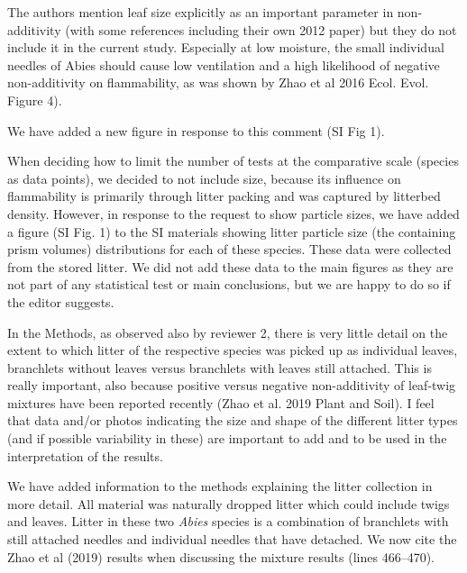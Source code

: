 \documentclass[letterpaper, 12pt]{letter}
\begin{document}
\begin{letter}{}
\begin{quoting}
  The authors mention leaf size explicitly as an important parameter in
  non-additivity (with some references including their own 2012 paper) but they
  do not include it in the current study. Especially at low moisture, the small
  individual needles of Abies should cause low ventilation and a high
  likelihood of negative non-additivity on flammability, as was shown by Zhao
  et al 2016 Ecol. Evol. Figure 4).
\end{quoting}

We have added a new figure in response to this comment (SI Fig 1).

When deciding how to limit the number of tests at the comparative scale
(species as data points), we decided to not include size, because its influence
on flammability is primarily through litter packing and was captured by
litterbed density. However, in response to the request to show particle sizes,
we have added a figure (SI Fig. 1) to the SI materials showing litter particle
size (the containing prism volumes) distributions for each of these species.
These data were collected from the stored litter. We did not add these data to
the main figures as they are not part of any statistical test or main
conclusions, but we are happy to do so if the editor suggests.


\begin{quoting}
  In the Methods, as observed also by reviewer 2, there is very little detail
  on the extent to which litter of the respective species was picked up as
  individual leaves, branchlets without leaves versus branchlets with leaves
  still attached. This is really important, also because positive versus
  negative non-additivity of leaf-twig mixtures have been reported recently
  (Zhao et al. 2019 Plant and Soil). I feel that data and/or photos indicating
  the size and shape of the different litter types (and if possible variability
  in these) are important to add and to be used in the interpretation of the
  results.
\end{quoting}

We have added information to the methods explaining the litter collection in
more detail. All material was naturally dropped litter which could include
twigs and leaves. Litter in these two \emph{Abies} species is a combination of
branchlets with still attached needles and individual needles that have
detached. We now cite the Zhao et al (2019) results when discussing the mixture
results (lines 466--470).


\end{letter}
\end{document}
